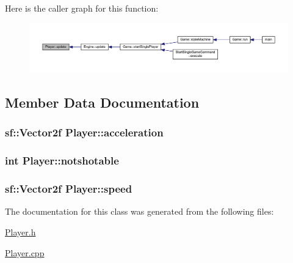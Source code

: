 Here is the caller graph for this function\+:
\nopagebreak
\begin{figure}[H]
\begin{center}
\leavevmode
\includegraphics[width=350pt]{class_player_a82c3476f3e65a4e2ac6bcd040771bdd4_icgraph}
\end{center}
\end{figure}




\subsection{Member Data Documentation}
\hypertarget{class_player_ae31035c38fbcf2684f34d7b792bbb93d}{}
\subsubsection[{acceleration}]{\setlength{\rightskip}{0pt plus 5cm}sf\+::\+Vector2f Player\+::acceleration}\label{class_player_ae31035c38fbcf2684f34d7b792bbb93d}
\hypertarget{class_player_a170241ab79d607c2350bf81c6747ecd7}{}
\subsubsection[{notshotable}]{\setlength{\rightskip}{0pt plus 5cm}int Player\+::notshotable}\label{class_player_a170241ab79d607c2350bf81c6747ecd7}
\hypertarget{class_player_aac86a0c16c74e68268e6f37f1b21659f}{}
\subsubsection[{speed}]{\setlength{\rightskip}{0pt plus 5cm}sf\+::\+Vector2f Player\+::speed}\label{class_player_aac86a0c16c74e68268e6f37f1b21659f}


The documentation for this class was generated from the following files\+:\begin{DoxyCompactItemize}
\item 
\hyperlink{_player_8h}{Player.\+h}\item 
\hyperlink{_player_8cpp}{Player.\+cpp}\end{DoxyCompactItemize}
